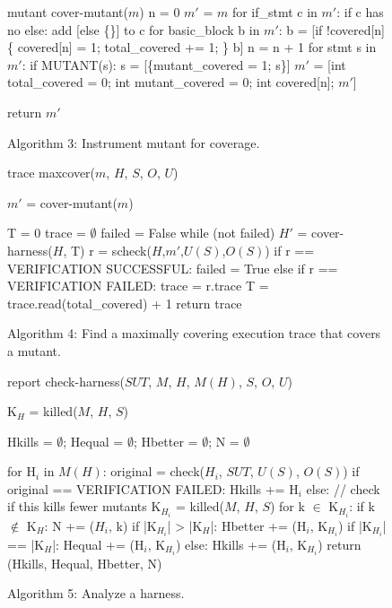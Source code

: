 \documentclass[conference]{IEEEtran}
\begin{document}
\begin{figure}
{\scriptsize 
\begin{code}
mutant cover-mutant($m$) 
\vspace{0.1in}
n = 0
$m'$ = $m$
for if\_stmt c in $m'$:
   if c has no else:
      add [else \{\}] to c
for basic\_block b in $m'$:
   b = [if !covered[n] \{
           covered[n] = 1;
           total\_covered += 1;
        \}
        b]
   n = n + 1
for stmt s in $m'$:
   if MUTANT(s):
      s = [\{mutant\_covered = 1;
            s\}]
$m'$ = [int total\_covered = 0;
      int mutant\_covered = 0;
      int covered[n];
      $m'$]

return $m'$
\end{code}
}
\caption{Algorithm 3: Instrument mutant for coverage.}
\label{alg:covermut}
\end{figure}

\begin{figure}
{\scriptsize 
\begin{code}
trace maxcover($m$, $H$, $S$, $O$, $U$) 
\vspace{0.1in}

$m'$ = cover-mutant($m$)

T = 0
trace = $\emptyset$
failed = False
while (not failed)
   $H'$ = cover-harness($H$, T)
   r = scheck($H$,$m'$,$U(S)$,$O(S)$)
   if r == VERIFICATION SUCCESSFUL:
     failed = True
   else if r == VERIFICATION FAILED:
     trace = r.trace
     T = trace.read(total\_covered) + 1
return trace
\end{code}
}
\caption{Algorithm 4: Find a maximally covering execution trace that
  covers a mutant.}
\label{alg:maxcover}
\end{figure}

\begin{figure}
{\scriptsize 
\begin{code}
report check-harness($SUT$, $M$, $H$, $M(H)$, $S$, $O$, $U$) 
\vspace{0.1in}

K$_H$ = killed($M$, $H$, $S$) 

Hkills = $\emptyset$; Hequal = $\emptyset$; Hbetter = $\emptyset$; N = $\emptyset$

for H$_i$ in $M(H)$:
   original = check($H_i$, $SUT$, $U(S)$, $O(S)$)
   if original == VERIFICATION FAILED: 
      Hkills += H$_i$
   else: // check if this kills fewer mutants
      K$_{H_i}$ = killed($M$, $H$, $S$)
      for k $\in$ K$_{H_i}$:
         if k $\not\in$ K$_H$: N += ($H_i$, k)
      if |K$_{H_i}$| > |K$_H$|:
         Hbetter += (H$_i$, K$_{H_i}$)
      if |K$_{H_i}$| == |K$_H$|:
         Hequal += (H$_i$, K$_{H_i}$)
      else:
         Hkills += (H$_i$, K$_{H_i}$)
return (Hkills, Hequal, Hbetter, N)
\end{code}
}
\caption{Algorithm 5: Analyze a harness.}
\label{alg:checkharness}
\end{figure}
\end{document}
